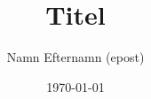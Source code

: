 \title{Titel}
\author{Namn Efternamn (epost)}
\date{\today}

\begin{titlepage}
	\maketitle
	\thispagestyle{fancy} 
	\headheight 35pt
	\rhead{\today}
\end{titlepage}